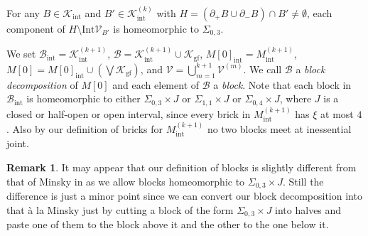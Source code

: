\documentclass{amsart}
\theoremstyle{definition}
\newtheorem{remark}[theorem]{Remark}
\numberwithin{figure}{section}
\numberwithin{equation}{section}
\def\cb{\mathcal{B}}
\def\ck{\mathcal{K}}
\def\cv{\mathcal{V}}
\def\eset{\emptyset}
\def\part{\partial}
\def\Int{\mathrm{Int}}
\def\Sg{\Sigma}
\def\Sg{\Sigma}
\begin{document}
For any $B\in \ck_{\mathrm{int}}$ and $B'\in \ck_{\mathrm{int}}^{(k)}$ with $H=(\part_+B\cup \part_-B)\cap 
B'\neq \eset$, each component of $H\setminus \Int \cv_{B'}$ is homeomorphic to $\Sg_{0,3}$.

\bigskip


We set $\cb_{\mathrm{int}}=\ck_{\mathrm{int}}^{(k+1)}$, $\cb=\ck_{\mathrm{int}}^{(k+1)}\cup \ck_{\mathrm{gf}}$, 
$M[0]_{\mathrm{int}}=M_{\mathrm{int}}^{(k+1)}$, $M[0]=M[0]_{\mathrm{int}}\cup (\bigvee \ck_{\mathrm{gf}})$, and
$\cv=\bigcup_{m=1}^{k+1} \cv^{(m)}$.
We call $\cb$  a \emph{block decomposition} of $M[0]$ and each element of $\cb$ a \emph{block}.
Note that each block in $\cb_{\mathrm{int}}$ is homeomorphic to either $\Sg_{0,3}\times J$ or $\Sg_{1,1}\times J$  
or $\Sg_{0,4}\times J$, where $J$ is a closed or half-open or open interval, since every brick in $M_\mathrm{int}^{(k+1)}$ has $\xi$ at most $4$.
Also by our definition of bricks for $M_{\mathrm{int}}^{(k+1)}$ no two blocks meet at inessential joint.

\begin{remark}
\label{two ways of block}
It may appear that our definition of blocks is slightly different from that of Minsky in \cite{mi2} as we allow blocks homeomorphic to $\Sg_{0,3} \times J$.
Still the difference is just a minor point since we can convert our block decomposition into that \`{a} la Minsky just by cutting  a block of the form $\Sg_{0,3} \times J$ into halves and paste one of them to the block above it and the other to the one below it.
\end{remark}
\end{document}

